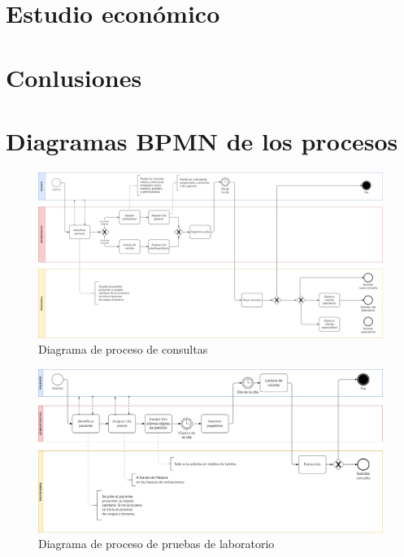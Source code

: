 \documentclass[12pt, a4paper, twoside, openright]{report}
\begin{document}
\chapter{Estudio económico}


\chapter{Conlusiones}


\appendix
\chapter{Diagramas BPMN de los procesos }

\begin{figure}
    \centering
    \begin{sideways}
        \includegraphics[width=0.95\textheight]{img/proceso-consultas.png}
    \end{sideways}
    \caption{Diagrama de proceso de consultas}
    \label{fig:proceso-consultas}
\end{figure}

\begin{figure}
    \centering
    \begin{sideways}
        \includegraphics[width=0.95\textheight]{img/proceso-pruebas.png}
    \end{sideways}
    \caption{Diagrama de proceso de pruebas de laboratorio}
    \label{fig:proceso-pruebas}
\end{figure}
\end{document}
